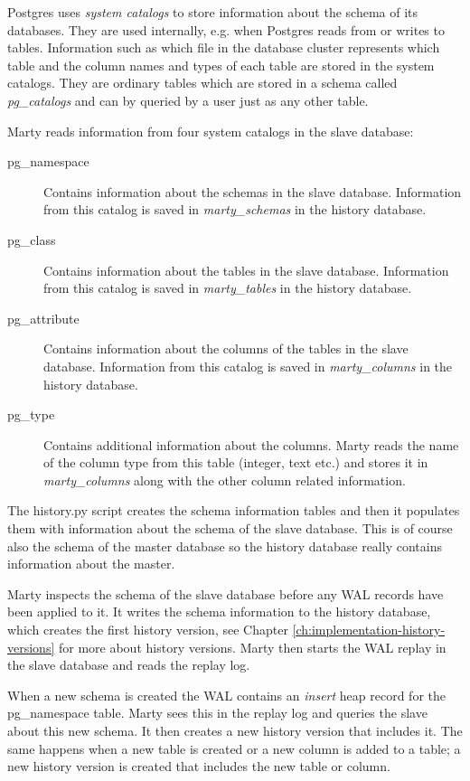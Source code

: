 Postgres uses \textit{system catalogs} to store information about the schema of its databases.
They are used internally, e.g. when Postgres reads from or writes to tables.
Information such as which file in the database cluster represents which table and the column names and types of each table are stored in the system catalogs.
They are ordinary tables which are stored in a schema called \textit{pg\_catalogs} and can by queried by a user just as any other table.

Marty reads information from four system catalogs in the slave database:

\begin{description}
  \item[pg\_namespace]
    Contains information about the schemas in the slave database.
    Information from this catalog is saved in \textit{marty\_schemas} in the history database. %
  \item[pg\_class]
    Contains information about the tables in the slave database.
    Information from this catalog is saved in \textit{marty\_tables} in the history database.
  \item[pg\_attribute]
    Contains information about the columns of the tables in the slave database.
    Information from this catalog is saved in \textit{marty\_columns} in the history database.
  \item[pg\_type]
    Contains additional information about the columns.
    Marty reads the name of the column type from this table (integer, text etc.) and stores it in \textit{marty\_columns} along with the other column related information.
\end{description}

The history.py script creates the schema information tables and then it populates them with information about the schema of the slave database.
This is of course also the schema of the master database so the history database really contains information about the master.

Marty inspects the schema of the slave database before any WAL records have been applied to it.
It writes the schema information to the history database, which creates the first history version, see Chapter \ref{ch:implementation-history-versions} for more about history versions.
Marty then starts the WAL replay in the slave database and reads the replay log.

When a new schema is created the WAL contains an \textit{insert} heap record for the pg\_namespace table.
Marty sees this in the replay log and queries the slave about this new schema.
It then creates a new history version that includes it.
The same happens when a new table is created or a new column is added to a table; a new history version is created that includes the new table or column.

